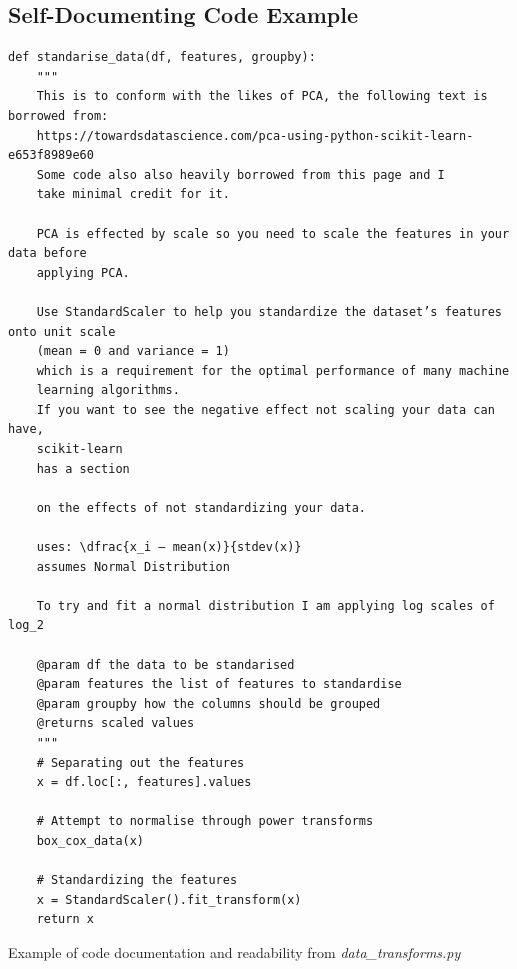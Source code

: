 \documentclass[11pt]{report}
\begin{document}
\subsection{Self-Documenting Code Example}
\label{sec-7-3-3}
\begin{listing}[H]
\begin{verbatim}
def standarise_data(df, features, groupby):
    """
    This is to conform with the likes of PCA, the following text is borrowed from:
    https://towardsdatascience.com/pca-using-python-scikit-learn-e653f8989e60
    Some code also also heavily borrowed from this page and I
    take minimal credit for it.

    PCA is effected by scale so you need to scale the features in your data before
    applying PCA.

    Use StandardScaler to help you standardize the dataset’s features onto unit scale
    (mean = 0 and variance = 1)
    which is a requirement for the optimal performance of many machine
    learning algorithms.
    If you want to see the negative effect not scaling your data can have,
    scikit-learn
    has a section

    on the effects of not standardizing your data.

    uses: \dfrac{x_i – mean(x)}{stdev(x)}
    assumes Normal Distribution

    To try and fit a normal distribution I am applying log scales of log_2

    @param df the data to be standarised
    @param features the list of features to standardise
    @param groupby how the columns should be grouped
    @returns scaled values
    """
    # Separating out the features
    x = df.loc[:, features].values

    # Attempt to normalise through power transforms
    box_cox_data(x)

    # Standardizing the features
    x = StandardScaler().fit_transform(x)
    return x
\end{verbatim}
\caption{\label{lst:docexample}Example of code documentation and readability from \emph{data\_transforms.py}}
\end{listing}

\clearpage


\end{document}
